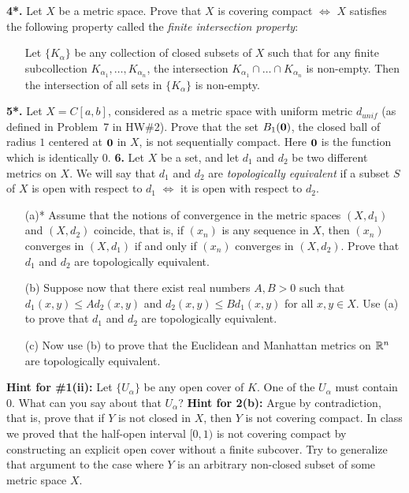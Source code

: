 \documentclass[11pt]{amsart}
\begin{document}
\skv
{\bf 4*.} Let $X$ be a metric space. Prove that $X$ is covering compact $\iff$
$X$ satisfies the following property called the {\it finite intersection property}: 
\begin{itemize}
\item[] Let $\{K_{\alpha}\}$ be any collection of closed subsets of $X$
such that for any finite subcollection $K_{\alpha_1},\ldots, K_{\alpha_n}$,
the intersection $K_{\alpha_1}\cap \ldots\cap K_{\alpha_n}$ is non-empty.
Then the intersection of all sets in $\{K_{\alpha}\}$ is non-empty. 
\end{itemize}
\skv
{\bf 5*.} Let $X=C[a,b]$, considered as a metric space with uniform metric $d_{unif}$
(as defined in Problem~7 in HW\#2). Prove that the set $B_1({\bf 0})$, the closed ball of radius $1$ centered at 
$\bf 0$ in $X$, is not sequentially compact. Here $\bf 0$ is the function which is identically $0$.
\skv
{\bf 6.} Let $X$ be a set, and let $d_1$ and $d_2$ be two different metrics on $X$.
We will say that $d_1$ and $d_2$ are {\it topologically equivalent} if a subset
$S$ of $X$ is open with respect to $d_1$ $\iff$ it is open with respect to $d_2$.
\begin{itemize}
\item[(a)*] Assume that the notions of convergence in the metric spaces $(X,d_1)$ and $(X,d_2)$ coincide,
that is, if $(x_n)$ is any sequence in $X$, then $(x_n)$ converges in $(X,d_1)$ if and only if 
$(x_n)$ converges in $(X,d_2)$. Prove that $d_1$ and $d_2$ are topologically equivalent.
\item[(b)] Suppose now that there exist real numbers $A,B > 0$ such that
$d_1(x,y)\leq A d_2(x,y)$ and $d_2(x,y)\leq B d_1(x,y)$ for all $x,y\in X$. Use (a) to
prove that $d_1$ and $d_2$ are topologically equivalent.
\item[(c)] Now use (b) to prove that the Euclidean and Manhattan metrics on ${\mathbb R}^n$
are topologically equivalent.
\end{itemize}
\skv

\skv
\newpage
{\bf Hint for \#1(ii):} Let $\{U_{\alpha}\}$ be any open cover of $K$. One of the $U_{\alpha}$
must contain $0$. What can you say about that $U_{\alpha}$?
\newpage
{\bf Hint for 2(b):} Argue by contradiction, that is, prove that if $Y$ is not closed in $X$, then $Y$ is not
covering compact. 
In class we proved that the half-open interval $[0,1)$ is not covering compact by constructing an explicit
open cover without a finite subcover. Try to generalize that argument to the case where $Y$ is an arbitrary non-closed
subset of some metric space $X$.
\end{document}
